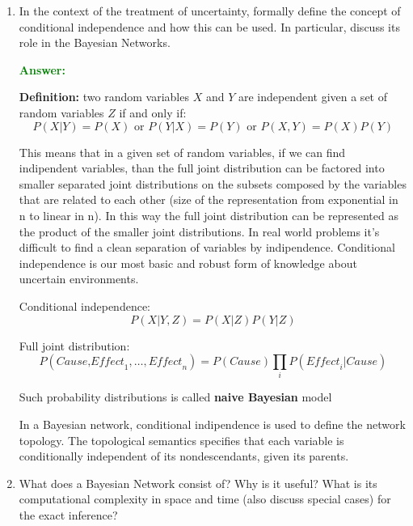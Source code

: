 \documentclass[12pt]{article}
\begin{document}
\begin{enumerate}[label=\textbf{U.\arabic*}]
    \item In the context of the treatment of uncertainty, formally define the concept of conditional independence and how this can be used. 
    In particular, discuss its role in the Bayesian Networks.

    \textcolor{green}{\textbf{Answer:}}

    \textbf{Definition:} two random variables $X$ and $Y$ are independent given a set of random variables $Z$ if and only if:
    \begin{equation}\label{eq:prob_ind}
        P(X|Y) = P(X) \text{ or } P(Y|X) = P(Y) \text{ or } P(X,Y) = P(X)P(Y)
    \end{equation}

    This means that in a given set of random variables, if we can find indipendent variables, than the full joint distribution
    can be factored into smaller separated joint distributions on the subsets composed by the variables that are related to each other
    (size of the representation from exponential in n to linear in n).
    In this way the full joint distribution can be represented as the product of the smaller joint distributions.
    In real world problems it's difficult to find a clean separation of variables by indipendence.
    Conditional independence is our most basic and robust form of knowledge about uncertain environments.

    Conditional independence:
    \begin{equation}\label{eq:prob_cond_ind}
        P(X|Y,Z) = P(X|Z)P(Y|Z)
    \end{equation}

    Full joint distribution:
    \begin{equation}
        P(\textit{Cause,Effect}_1,\ldots,\textit{Effect}_n) = P(Cause)\prod_{i} P(\textit{Effect}_i|Cause)
    \end{equation}

    Such probability distributions is called \textbf{naive Bayesian} model

    In a Bayesian network, conditional indipendence is used to define the network topology.
    The topological semantics specifies that each variable is conditionally independent of its nondescendants, given its parents.

    \item What does a Bayesian Network consist of? 
    Why is it useful?
    What is its computational complexity in space and time (also discuss special cases) for the exact inference?


\end{enumerate}
\end{document}
